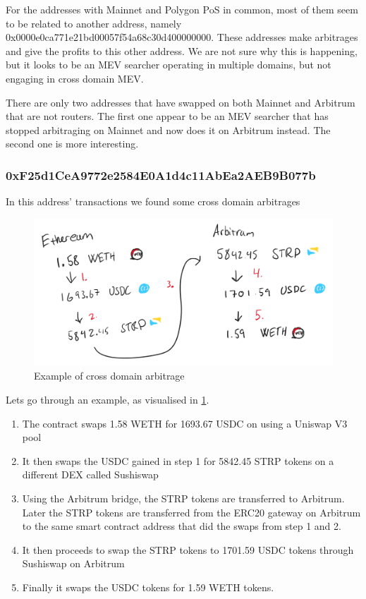For the addresses with Mainnet and Polygon PoS in common, most of them seem to be related to another address, namely 0x0000e0ca771e21bd00057f54a68c30d400000000. These addresses make arbitrages and give the profits to this other address. We are not sure why this is happening, but it looks to be an MEV searcher operating in multiple domains, but not engaging in cross domain MEV.

There are only two addresses that have swapped on both Mainnet and Arbitrum that are not routers. The first one appear to be an MEV searcher that has stopped arbitraging on Mainnet and now does it on Arbitrum instead. The second one is more interesting.
\subsubsection{0xF25d1CeA9772e2584E0A1d4c11AbEa2AEB9B077b}
In this address' transactions we found some cross domain arbitrages

\begin{figure}[H]
    \centering
    \includegraphics[width=\textwidth]{3_FIGURES/Results/CDMEV.PNG}
    \caption{Example of cross domain arbitrage}
    \label{cdmev}
\end{figure}

Lets go through an example, as visualised in \ref{cdmev}.
\begin{enumerate}
    \item The contract swaps 1.58 WETH for 1693.67 USDC on using a Uniswap V3  pool
    \item It then swaps the USDC gained in step 1 for 5842.45 STRP tokens on a different DEX called Sushiswap
    \item Using the Arbitrum bridge, the STRP tokens are transferred to Arbitrum. Later the STRP tokens are transferred from the ERC20 gateway on Arbitrum to the same smart contract address that did the swaps from step 1 and 2.
    \item It then proceeds to swap the STRP tokens to 1701.59 USDC tokens through
    Sushiswap on Arbitrum
    \item  Finally it swaps the USDC tokens for 1.59 WETH tokens.
\end{enumerate}

